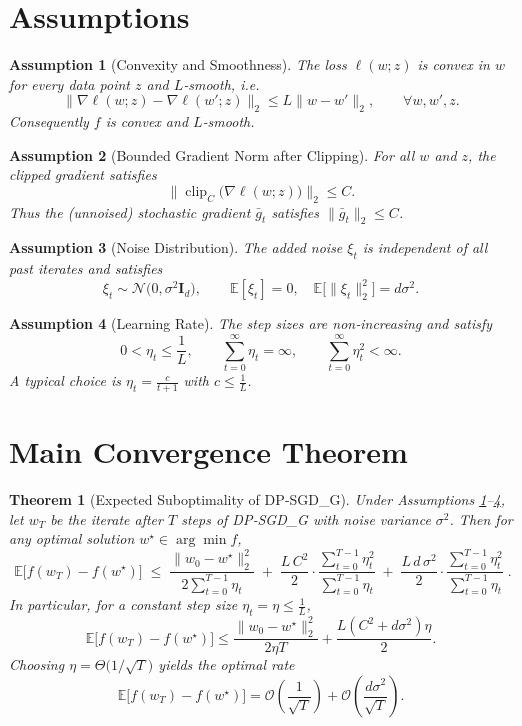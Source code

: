 \documentclass{article}
\newtheorem{theorem}{Theorem}
\newtheorem{assumption}{Assumption}
\begin{document}
\bigskip

\section*{Assumptions}
\begin{assumption}[Convexity and Smoothness]\label{ass:convex-smooth}
The loss $\ell(w;z)$ is convex in $w$ for every data point $z$ and $L$‑smooth, i.e.
\[
\|\nabla\ell(w;z)-\nabla\ell(w';z)\|_2\le L\|w-w'\|_2,\qquad\forall w,w',z.
\]
Consequently $f$ is convex and $L$‑smooth.
\end{assumption}

\begin{assumption}[Bounded Gradient Norm after Clipping]\label{ass:clip}
For all $w$ and $z$, the clipped gradient satisfies
\[
\bigl\|\operatorname{clip}_C\bigl(\nabla\ell(w;z)\bigr)\bigr\|_2\le C.
\]
Thus the (unnoised) stochastic gradient $\bar g_t$ satisfies $\|\bar g_t\|_2\le C$.
\end{assumption}

\begin{assumption}[Noise Distribution]\label{ass:noise}
The added noise $\xi_t$ is independent of all past iterates and satisfies
\[
\xi_t\sim\mathcal{N}\bigl(0,\sigma^{2}\mathbf{I}_d\bigr),\qquad\mathbb{E}[\xi_t]=0,\quad\mathbb{E}\bigl[\|\xi_t\|_2^{2}\bigr]=d\sigma^{2}.
\]
\end{assumption}

\begin{assumption}[Learning Rate]\label{ass:lr}
The step sizes are non‑increasing and satisfy
\[
0<\eta_t\le\frac{1}{L},\qquad \sum_{t=0}^{\infty}\eta_t=\infty,\qquad \sum_{t=0}^{\infty}\eta_t^{2}<\infty .
\]
A typical choice is $\eta_t=\frac{c}{t+1}$ with $c\le\frac{1}{L}$.
\end{assumption}

\bigskip

\section*{Main Convergence Theorem}
\begin{theorem}[Expected Suboptimality of DP‑SGD\_G]\label{thm:conv}
Under Assumptions \ref{ass:convex-smooth}–\ref{ass:lr}, let $w_T$ be the iterate after $T$ steps of DP‑SGD\_G with noise variance $\sigma^{2}$. Then for any optimal solution $w^{\star}\in\arg\min f$,
\[
\boxed{\;
\mathbb{E}\bigl[f(w_T)-f(w^{\star})\bigr]
\;\le\;
\frac{\|w_0-w^{\star}\|_2^{2}}{2\sum_{t=0}^{T-1}\eta_t}
\;+\;
\frac{L\,C^{2}}{2}\cdot\frac{\sum_{t=0}^{T-1}\eta_t^{2}}{\sum_{t=0}^{T-1}\eta_t}
\;+\;
\frac{L\,d\,\sigma^{2}}{2}\cdot\frac{\sum_{t=0}^{T-1}\eta_t^{2}}{\sum_{t=0}^{T-1}\eta_t}\; }.
\]
In particular, for a constant step size $\eta_t=\eta\le\frac{1}{L}$,
\[
\mathbb{E}\bigl[f(w_T)-f(w^{\star})\bigr]\le
\frac{\|w_0-w^{\star}\|_2^{2}}{2\eta T}
+\frac{L(C^{2}+d\sigma^{2})\eta}{2}.
\]
Choosing $\eta=\Theta\bigl(1/\sqrt{T}\bigr)$ yields the optimal rate
\[
\mathbb{E}\bigl[f(w_T)-f(w^{\star})\bigr]=\mathcal{O}\!\left(\frac{1}{\sqrt{T}}\right)
+ \mathcal{O}\!\left(\frac{d\sigma^{2}}{\sqrt{T}}\right).
\]
\end{theorem}
\end{document}
